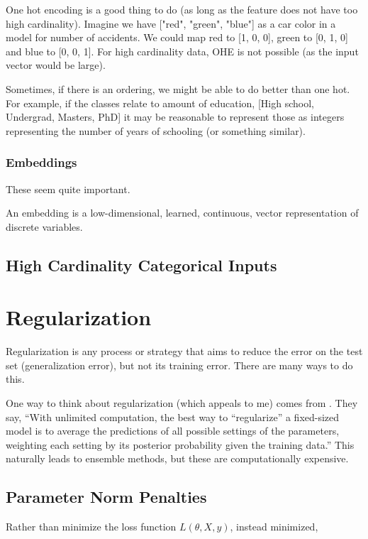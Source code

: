 \documentclass{article}
\begin{document}
One hot encoding is a good thing to do (as long as the feature does not have too high cardinality). Imagine we have ["red", "green", "blue"] as a car color in a model for number of accidents. We could map red to [1, 0, 0], green to [0, 1, 0] and blue to [0, 0, 1].
For high cardinality data, OHE is not possible (as the input vector would be large).

Sometimes, if there is an ordering, we might be able to do better than one hot. For example, if the classes relate to amount of education, [High school, Undergrad, Masters, PhD] it may be reasonable to represent those as integers representing the number of years of schooling (or something similar).

\subsubsection{Embeddings}

These seem quite important.

An embedding is a low-dimensional, learned, continuous, vector representation of discrete variables.

\subsection{High Cardinality Categorical Inputs}


\section{Regularization}

Regularization is any process or strategy that aims to reduce the error on the test set (generalization error), but not its training error.
There are many ways to do this.

One way to think about regularization (which appeals to me) comes from \citet{Srivastava2014}. They say,
``With unlimited computation, the best way to “regularize” a fixed-sized model is to
average the predictions of all possible settings of the parameters, weighting each setting by its posterior probability given the training data.''
This naturally leads to ensemble methods, but these are computationally expensive.


\subsection{Parameter Norm Penalties}

Rather than minimize the loss function $L(\theta, X, y)$, instead minimized,
\end{document}
